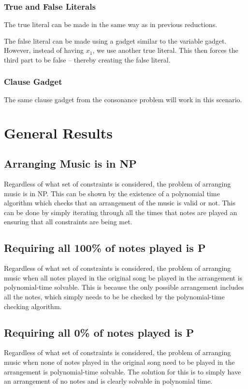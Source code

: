 \documentclass[11pt,letterpaper]{article}
\begin{document}
\subsubsection{True and False Literals}
The true literal can be made in the same way as in previous reductions.

The false literal can be made using a gadget similar to the variable gadget. However, instead of having $x_1$, we use another true literal. This then forces the third part to be false -- thereby creating the false literal.

\subsubsection{Clause Gadget}
The same clause gadget from the consonance problem will work in this scenario.

\section{General Results}
\subsection{Arranging Music is in NP}
Regardless of what set of constraints is considered, the problem of arranging music is in NP. This can be shown by the existence of a polynomial time algorithm which checks that an arrangement of the music is valid or not. This can be done by simply iterating through all the times that notes are played an ensuring that all constraints are being met.

\subsection{Requiring all 100\% of notes played is P}
Regardless of what set of constraints is considered, the problem of arranging music when all notes played in the original song be played in the arrangement is polynomial-time solvable. This is because the only possible arrangement includes all the notes, which simply needs to be be checked by the polynomial-time checking algorithm.

\subsection{Requiring all 0\% of notes played is P}
Regardless of what set of constraints is considered, the problem of arranging music when none of notes played in the original song need to be played in the arrangement is polynomial-time solvable. The solution for this is to simply have an arrangement of no notes and is clearly solvable in polynomial time.
\end{document}
